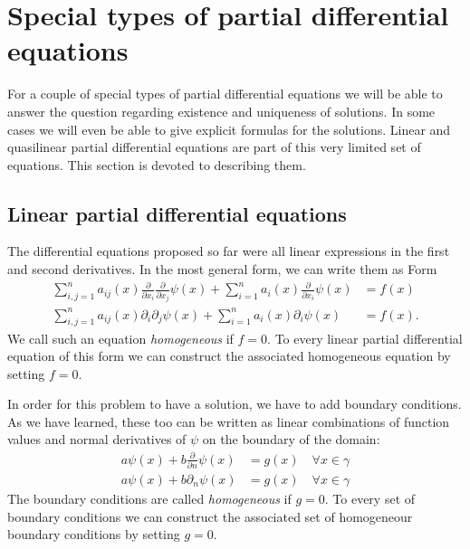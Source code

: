%
%
%
\section{Special types of partial differential equations
\label{klassifikation:spezielletypen}}
For a couple of special types of partial differential equations we will
be able to answer the question regarding existence and uniqueness of 
solutions.
In some cases we will even be able to give explicit formulas for the solutions.
Linear and quasilinear partial differential equations are part of this
very limited set of equations.
This section is devoted to describing them.

\subsection{Linear partial differential equations\label{klassifikation:linear}}
The differential equations proposed so far were all linear expressions in
the first and second derivatives.
In the most general form, we can write them as
Form
\begin{align*}
\sum_{i,j=1}^n a_{ij}(x)\frac{\partial}{\partial x_i} \frac{\partial}{\partial x_j}\psi(x)
+\sum_{i=1}^na_i(x)\frac{\partial}{\partial x_i}\psi(x)&=f(x)
\\
\sum_{i,j=1}^n a_{ij}(x)\partial_i \partial_j\psi(x)
+\sum_{i=1}^na_i(x)\partial_i\psi(x)&=f(x).
\end{align*}
We call such an equation {\em homogeneous} if $f=0$.
To every linear partial differential equation of this form we can construct
the associated homogeneous equation by setting $f=0$.

In order for this problem to have a solution, we have to add boundary
conditions.
As we have learned, these too can be written as linear combinations
of function values and normal derivatives of $\psi$ on the boundary
of the domain:
\begin{align*}
a\psi(x)+
b\frac{\partial}{\partial n}\psi(x)
&=g(x)\quad\forall x\in\gamma\\
a\psi(x)+b\partial_n\psi(x)&=g(x)\quad\forall x\in\gamma
\end{align*}
The boundary conditions are called {\em homogeneous} if $g=0$.
To every set of boundary conditions we can construct the associated
set of homogeneour boundary conditions by setting $g=0$.

